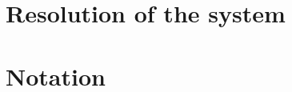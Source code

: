 \documentclass[12pt]{amsart}
\numberwithin{equation}{section}
\begin{document}
\appendix


\section{Resolution of the system}
\label{sec:resolution}



\section{Notation}
\label{sec:notation}




\begin{bibdiv}
\begin{biblist}
\end{biblist}
\end{bibdiv}
\end{document}
